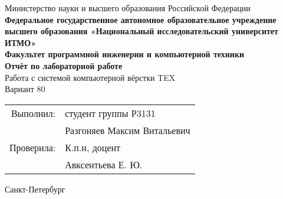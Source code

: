 \begin{titlepage}
    \centering
    {\large Министерство науки и высшего образования Российской Федерации}\\[0.5cm]
    {\large \textbf{Федеральное государственное автономное образовательное учреждение высшего образования «Национальный исследовательский университет ИТМО»}}\\[0.5cm]
    {\large \textbf{Факультет программной инженерии и компьютерной техники}}\\[6cm]

    {\LARGE \textbf{Отчёт по лабораторной работе}}\\[0.5cm]
    {\Large Работа с системой компьютерной вёрстки TEX}\\[0.5cm]
    {\large Вариант 80} \\[4.5cm]

    \begin{flushright}
        \begin{tabular}{rl}
            Выполнил: & студент группы Р3131 \\[0.2cm]
                         & Разгоняев Максим Витальевич \\[1cm]
            Проверила: & К.п.н, доцент \\[0.2cm]
                         & Авксентьева Е. Ю. \\
        \end{tabular}
    \end{flushright}

    \vfill

    {\large Санкт-Петербург \the\year}
\end{titlepage}
